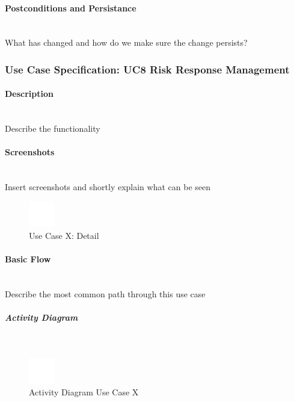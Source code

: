 \paragraph*{Postconditions and Persistance}\mbox{}\\
What has changed and how do we make sure the change persists?

\newpage
\subsubsection{Use Case Specification: \ac{UC}8 Risk Response Management}
\label{sec:domainBbi}

\paragraph*{Description}\mbox{}\\
Describe the functionality

\paragraph*{Screenshots}\mbox{}\\
Insert screenshots and shortly explain what can be seen
\begin{figure}[h] 
	\centering
	\includegraphics[width=0.1\textwidth]{Content/Domain/placeholder.png}
	\caption{Use Case X: Detail}
	\label{fig:label8}
\end{figure}

\paragraph*{Basic Flow} \mbox{}\\

Describe the most common path through this use case

\subparagraph{Activity Diagram}\mbox{}\\
\begin{figure}[h]
	\centering
	\includegraphics[width=0.1\textwidth]{Content/Domain/placeholder.png}
	\caption{Activity Diagram Use Case X}
	\label{fig:label88}
\end{figure}

